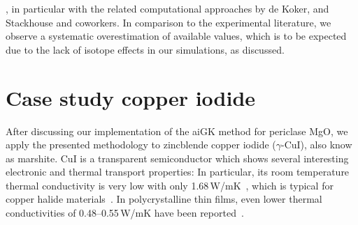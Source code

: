 , in particular with the related computational approaches by de Koker, and Stackhouse and coworkers. In comparison to the experimental literature, we observe a systematic overestimation of available values, which is to be expected due to the lack of isotope effects in our simulations, as discussed.




\section{Case study copper iodide}

After discussing our implementation of the aiGK method %
for periclase MgO,
we apply the presented methodology to zincblende copper iodide ($\gamma$-CuI), also know as marshite. CuI is a transparent semiconductor which shows several interesting electronic and thermal transport properties: In particular, its room temperature thermal conductivity is very low with only 1.68\,W/mK~\cite{perry2016}, which is typical for copper halide materials~\cite{Slack.1982}. In polycrystalline thin films, even lower thermal conductivities of 0.48--0.55\,W/mK have been reported~\cite{Yang.2017,Coroa.2019}.

